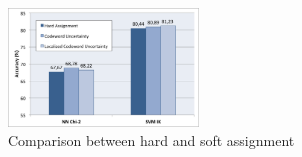 \begin{figure}[h]
\begin{center}
\includegraphics[width=0.45\textwidth]{images/soft-comparison.png}
\end{center}
  \caption{Comparison between hard and soft assignment}
\label{fig:soft}
\end{figure}
